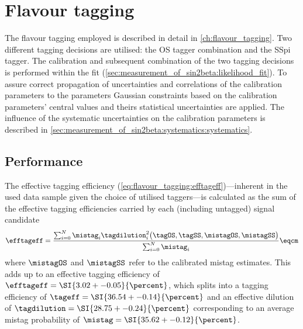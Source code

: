 
\section{Flavour tagging}
\label{sec:measurement_of_sin2beta:flavour_tagging}

The flavour tagging employed is described in detail in
\cref{ch:flavour_tagging}. Two different tagging decisions are utilised: the
\acf{OS} tagger combination and the \acf{SSpi} tagger. The calibration and
subsequent combination of the two tagging decisions is performed within the fit
(\cf \cref{sec:measurement_of_sin2beta:likelihood_fit}). To assure correct
propagation of uncertainties and correlations of the calibration parameters to
the \CP parameters Gaussian constraints based on the calibration parameters'
central values and theirs statistical uncertainties are applied. The influence
of the systematic uncertainties on the calibration parameters is described in
\cref{sec:measurement_of_sin2beta:systematics:systematics}.

\subsection{Performance}
\label{sec:measurement_of_sin2beta:flavour_tagging:performance}

The effective tagging efficiency
(\cref{eq:flavour_tagging:efftageff})---inherent in the used data sample given
the choice of utilised taggers---is calculated as the sum of the effective
tagging efficiencies carried by each (including untagged) signal candidate
%
\begin{equation}
  \efftageff = \frac{\sum_{i=0}^{N} \mistag_i \tagdilution_i^2\big(\tagOS, \tagSS, \mistagOS, \mistagSS \big)}{\sum_{i=0}^{N} \mistag_i}\eqcm
\end{equation}
%
where $\mistagOS$ and $\mistagSS$ refer to the calibrated mistag estimates. This
adds up to an effective tagging efficiency of $\efftageff = \SI{3.02 +-
0.05}{\percent}$, which splits into a tagging efficiency of $\tageff = \SI{36.54
+- 0.14}{\percent}$ and an effective dilution of $\tagdilution = \SI{28.75 +-
0.24}{\percent}$ corresponding to an average mistag probability of $\mistag =
\SI{35.62 +- 0.12}{\percent}$.


